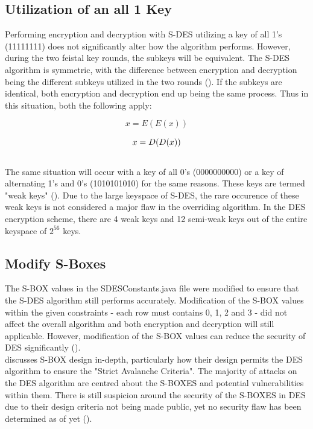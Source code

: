 \documentclass[]{article}
\begin{document}
\newpage
\subsection*{Utilization of an all 1 Key}

Performing encryption and decryption with S-DES utilizing a key of all 1's (11111111) does not significantly alter how the algorithm performs. However, during the two feistal key rounds, the subkeys will be equivalent. The S-DES algorithm is symmetric, with the difference between encryption and decryption being the different subkeys utilized in the two rounds (\cite{sdes_anal}). If the subkeys are identical, both encryption and decryption end up being the same process. Thus in this situation, both the following apply:

$$x=E( E(x) )$$

$$x=D( D(x) )\\$$\\

The same situation will occur with a key of all 0's (0000000000) or a key of alternating 1's and 0's (1010101010) for the same reasons. These keys are termed "weak keys" (\cite{alttext}). Due to the large keyspace of S-DES, the rare occurence of these weak keys is not considered a major flaw in the overriding algorithm. In the DES encryption scheme, there are 4 weak keys and 12 semi-weak keys out of the entire keyspace of $2^{56}$ keys.

\subsection*{Modify S-Boxes}


The S-BOX values in the SDESConstants.java file were modified to ensure that the S-DES algorithm still performs accurately. Modification of the S-BOX values within the given constraints - each row must contains 0, 1, 2 and 3 - did not affect the overall algorithm and both encryption and decryption will still applicable. However, modification of the S-BOX values can reduce the security of DES significantly (\cite{maintext}).\\

\cite{sans} discusses S-BOX design in-depth, particularly how their design permits the DES algorithm to ensure the "Strict Avalanche Criteria". The majority of attacks on the DES algorithm are centred about the S-BOXES and potential vulnerabilities within them. There is still suspicion around the security of the S-BOXES in DES due to their design criteria not being made public, yet no security flaw has been determined as of yet (\cite{maintext}).
\end{document}

